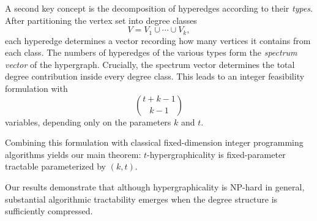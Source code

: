 \documentclass[pdflatex,sn-mathphys-num]{sn-jnl}%
\theoremstyle{thmstyleone}%
\theoremstyle{thmstyletwo}%
\theoremstyle{thmstylethree}%
\begin{document}
A second key concept is the decomposition of hyperedges according to their \emph{types}. After partitioning the vertex set into degree classes
\[
V = V_1 \cup \cdots \cup V_k,
\]
each hyperedge determines a vector recording how many vertices it contains from each class. The numbers of hyperedges of the various types form the \emph{spectrum vector} of the hypergraph. Crucially, the spectrum vector determines the total degree contribution inside every degree class. This leads to an integer feasibility formulation with
\[
\binom{t+k-1}{k-1}
\]
variables, depending only on the parameters $k$ and $t$.

Combining this formulation with classical fixed-dimension integer programming algorithms yields our main theorem: $t$-hypergraphicality is fixed-parameter tractable parameterized by $(k,t)$.

Our results demonstrate that although hypergraphicality is NP-hard in general, substantial algorithmic tractability emerges when the degree structure is sufficiently compressed.






\end{document}
